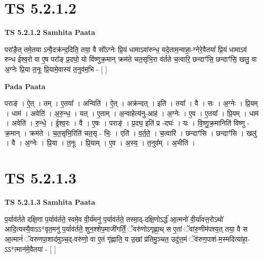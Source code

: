 \documentclass[17pt]{extarticle}
\begin{document}

\section{ TS 5.2.1.2 }

\textbf{TS 5.2.1.2 } \newline
\textbf{Samhita Paata} \newline

परा॑ङै॒त् तमे॒तया ऽन्वै॒दक्र॑न्द॒दिति॒ तया॒ वै सो᳚ऽग्नेः प्रि॒यं धामाऽवा॑रुन्ध॒ यदे॒ताम॒न्वाहा॒-ग्नेरे॒वैतया᳚ प्रि॒यं धामाऽव॑ रुन्ध ईश्व॒रो वा ए॒ष परा᳚ङ् प्र॒दघो॒ यो वि॑ष्णुक्र॒मान् क्रम॑ते चत॒सृभि॒रा व॑र्तते च॒त्वारि॒ छन्दाꣳ॑सि॒ छन्दाꣳ॑सि॒ खलु॒ वा अ॒ग्नेः प्रि॒या त॒नूः प्रि॒यामे॒वास्य॑ त॒नुव॑म॒भि - [  ] \newline

\textbf{Pada Paata} \newline

पराङ्॑ । ऐ॒त् । तम् । ए॒तया᳚ । अन्विति॑ । ऐ॒त् । अक्र॑न्दत् । इति॑ । तया᳚ । वै । सः । अ॒ग्नेः । प्रि॒यम् । धाम॑ । अवेति॑ । अ॒रु॒न्ध॒ । यत् । ए॒ताम् । अ॒न्वाहेत्य॑नु-आह॑ । अ॒ग्नेः । ए॒व । ए॒तया᳚ । प्रि॒यम् । धाम॑ । अवेति॑ । रु॒न्धे॒ । ई॒श्व॒रः । वै । ए॒षः । पराङ्॑ । प्र॒दघ॒ इति॑ प्र -दघः॑ । यः । वि॒ष्णु॒क्र॒मानिति॑ विष्णु - क्र॒मान् । क्रम॑ते । च॒त॒सृभि॒रिति॑ चत॒सृ - भिः॒ । एति॑ । व॒र्त॒ते॒ । च॒त्वारि॑ । छन्दाꣳ॑सि । छन्दाꣳ॑सि । खलु॑ । वै । अ॒ग्नेः । प्रि॒या । त॒नूः । प्रि॒याम् । ए॒व । अ॒स्य॒ । त॒नुव᳚म् । अ॒भीति॑ ।  \newline





\section{ TS 5.2.1.3 }

\textbf{TS 5.2.1.3 } \newline
\textbf{Samhita Paata} \newline

प॒र्याव॑र्तते दक्षि॒णा प॒र्याव॑र्तते॒ स्वमे॒व वी॒र्य॑मनु॑ प॒र्याव॑र्तते॒ तस्मा॒द्-दक्षि॒णोऽर्द्ध॑ आ॒त्मनो॑ वी॒र्या॑वत्त॒रोऽथो॑ आदि॒त्यस्यै॒वाऽऽ*वृत॒मनु॑ प॒र्याव॑र्तते॒ शुन॒श्शेप॒माजी॑गर्तिं॒ ॅवरु॑णोऽगृह्णा॒थ् स ए॒तां ॅवा॑रु॒णीम॑पश्य॒त् तया॒ वै स आ॒त्मानं॑ ॅवरुणपा॒शाद॑मुञ्च॒द्-वरु॑णो॒ वा ए॒तं गृ॑ह्णाति॒ य उ॒खां प्र॑तिमु॒ञ्चत॒ उदु॑त्त॒मं ॅव॑रुण॒पाश॑-म॒स्मदित्या॑हा॒-ऽऽ*त्मान॑मे॒वैतया॑ - [  ] \newline
\end{document}

